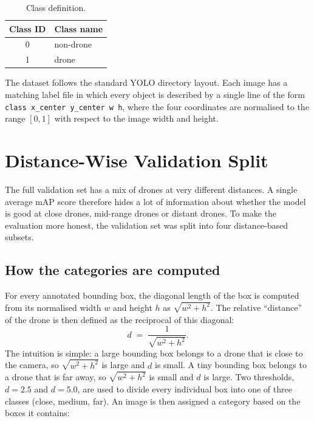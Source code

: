 \documentclass[12pt,a4paper]{report}
\begin{document}
\begin{table}[H]
\centering
\caption{Class definition.}
\label{tab:classes}
\begin{tabular}{cl}
\toprule
\textbf{Class ID} & \textbf{Class name} \\
\midrule
0 & non-drone \\
1 & drone \\
\bottomrule
\end{tabular}
\end{table}

The dataset follows the standard YOLO directory layout. Each image has a
matching label file in which every object is described by a single line of the
form \texttt{class\ x\_center\ y\_center\ w\ h}, where the four coordinates
are normalised to the range $[0, 1]$ with respect to the image width and
height.

\section{Distance-Wise Validation Split}
\label{sec:dist-split}
The full validation set has a mix of drones at very different distances. A
single average mAP score therefore hides a lot of information about whether the
model is good at close drones, mid-range drones or distant drones. To make the
evaluation more honest, the validation set was split into four
distance-based subsets.

\subsection{How the categories are computed}
For every annotated bounding box, the diagonal length of the box is computed
from its normalised width $w$ and height $h$ as $\sqrt{w^{2}+h^{2}}$. The
relative ``distance'' of the drone is then defined as the reciprocal of this
diagonal:
\begin{equation}
d \;=\; \frac{1}{\sqrt{w^{2}+h^{2}}}.
\end{equation}
The intuition is simple: a large bounding box belongs to a drone that is close
to the camera, so $\sqrt{w^{2}+h^{2}}$ is large and $d$ is small. A tiny
bounding box belongs to a drone that is far away, so $\sqrt{w^{2}+h^{2}}$ is
small and $d$ is large. Two thresholds, $d = 2.5$ and $d = 5.0$, are used to
divide every individual box into one of three classes (close, medium, far). An
image is then assigned a category based on the boxes it contains:
\end{document}
